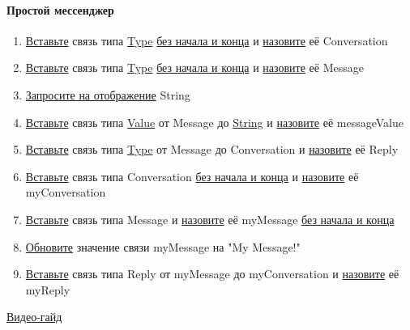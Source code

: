 \paragraph{Простой мессенджер}
\begin{enumerate}
      \item \hyperlink{DeepCase.InsertLink.Description}{Вставьте} связь типа
            \hyperlink{Core.Type.Description}{Type}
            \hyperlink{FAQ.HowToInsertLinkWithoutFromAndTo}{без
                  начала и конца} и \hyperlink{FAQ.HowToSetName}{назовите} её
            Conversation
      \item \hyperlink{DeepCase.InsertLink.Description}{Вставьте} связь типа
            \hyperlink{Core.Type.Description}{Type}
            \hyperlink{FAQ.HowToInsertLinkWithoutFromAndTo}{без
                  начала и конца} и
            \hyperlink{FAQ.HowToSetName}{назовите} её Message
      \item \hyperlink{Core.Query.Description}{Запросите на отображение} String
      \item \hyperlink{DeepCase.InsertLink.Description}{Вставьте} связь типа
            \hyperlink{Core.Value.Description}{Value} от Message до
            \hyperlink{Core.String.Description}{String} и
            \hyperlink{FAQ.HowToSetName}{назовите} её messageValue
      \item \hyperlink{DeepCase.InsertLink.Description}{Вставьте} связь типа
            \hyperlink{Core.Type.Description}{Type} от Message до Conversation
            и
            \hyperlink{FAQ.HowToSetName}{назовите} её Reply
      \item \hyperlink{DeepCase.InsertLink.Description}{Вставьте} связь типа
            Conversation
            \hyperlink{FAQ.HowToInsertLinkWithoutFromAndTo}{без начала и конца} и
            \hyperlink{FAQ.HowToSetName}{назовите} её myConversation
      \item \hyperlink{DeepCase.InsertLink.Description}{Вставьте} связь типа
            Message и \hyperlink{FAQ.HowToSetName}{назовите} её myMessage
            \hyperlink{FAQ.HowToInsertLinkWithoutFromAndTo}{без начала и конца}
      \item \hyperlink{DeepCase.UpdateLink.Description}{Обновите} значение связи
            myMessage на "My Message!"
      \item \hyperlink{DeepCase.InsertLink.Description}{Вставьте} связь типа
            Reply от
            myMessage до myConversation и \hyperlink{FAQ.HowToSetName}{назовите} её
            myReply
\end{enumerate}
\href{https://youtu.be/1ihR5gZrw6M}{Видео-гайд}
